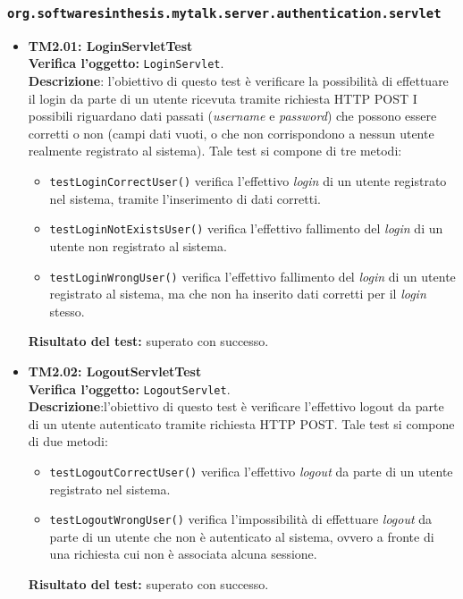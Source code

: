 \subsubsection{\texttt{org.softwaresinthesis.mytalk.server.authentication.servlet}}
\begin{itemize}
\item \textbf{TM2.01: LoginServletTest}\\
\textbf{Verifica l'oggetto:} \texttt{LoginServlet}.\\
\textbf{Descrizione}: l'obiettivo di questo test è verificare la possibilità di effettuare il login da parte di un utente ricevuta tramite richiesta HTTP POST I possibili  riguardano dati passati (\textit{username} e \textit{password}) che possono essere corretti o non (campi dati vuoti, o che non corrispondono a nessun utente realmente registrato al sistema).
Tale test si compone di tre metodi:
\begin{itemize}
\item \texttt{testLoginCorrectUser()} verifica l'effettivo \textit{login} di un utente registrato nel sistema, tramite l'inserimento di dati corretti.
\item \texttt{testLoginNotExistsUser()} verifica l'effettivo fallimento del \textit{login} di un utente non registrato al sistema.
\item \texttt{testLoginWrongUser()} verifica l'effettivo fallimento del \textit{login} di un utente  registrato al sistema, ma che non ha inserito dati corretti per il \textit{login} stesso.
\end{itemize}
\textbf{Risultato del test:} superato con successo.

\item \textbf{TM2.02: LogoutServletTest}\\
\textbf{Verifica l'oggetto:} \texttt{LogoutServlet}.\\
\textbf{Descrizione}:l'obiettivo di questo test è verificare l'effettivo logout da parte di un utente autenticato tramite richiesta HTTP POST.
Tale test si compone di due metodi:

\begin{itemize}
\item \texttt{testLogoutCorrectUser()}  verifica l'effettivo \textit{logout} da parte di un utente registrato nel sistema.
\item \texttt{testLogoutWrongUser()} verifica l'impossibilità di effettuare \textit{logout} da parte di un utente che non è autenticato al sistema, ovvero a fronte di una richiesta cui non è associata alcuna sessione.
\end{itemize}
\textbf{Risultato del test:} superato con successo.


\end{itemize}
